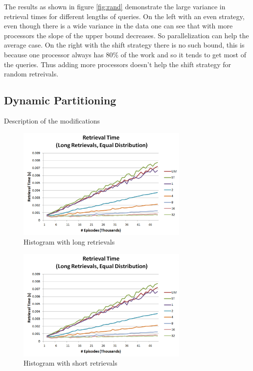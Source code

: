 \documentclass[11pt]{article} %
\begin{document}
The results as shown in figure \ref{fig:rand} demonstrate the large variance in retrieval times for different lengths of queries.
On the left with an even strategy, even though there is a wide variance in the data one can see that with more processors the slope of the upper bound
decreases. So parallelization can help the average case. On the right with the shift strategy there is no such bound, 
this is because one processor always has $80\%$ of the work and so it tends to get most of the queries. Thus
adding more processors doesn't help the shift strategy for random retreivals. 



\subsection{Dynamic Partitioning}
Description of the modifications
\begin{figure}[h]
\caption{Histogram with long retrievals}
\centering
\includegraphics[width=0.75\textwidth]{images/ret_worst_eq}
\end{figure}

\begin{figure}[h]
\caption{Histogram with short retrievals}
\centering
\includegraphics[width=0.75\textwidth]{images/ret_worst_eq}
\end{figure}
\end{document}
